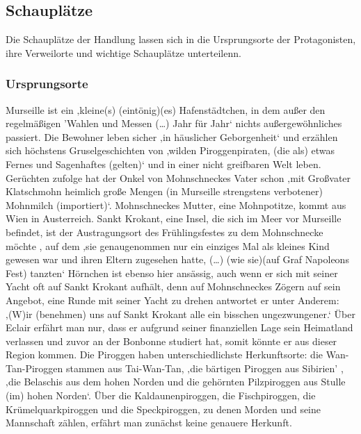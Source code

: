 \subsection{Schauplätze}
Die Schauplätze der Handlung lassen sich in die Ursprungsorte der Protagonisten, ihre Verweilorte und wichtige Schauplätze unterteilenn.

\subsubsection{Ursprungsorte}

Murseille ist ein ‚kleine(s) (eintönig)(es) Hafenstädtchen, in dem außer den regelmäßigen 'Wahlen und Messen (…) Jahr für Jahr‘\cite[S. 10]{pir} nichts außergewöhnliches passiert. Die Bewohner leben sicher ‚in häuslicher Geborgenheit‘ und erzählen sich höchstens Gruselgeschichten von ‚wilden Piroggenpiraten, (die als) etwas Fernes und Sagenhaftes (gelten)‘ \cite[S.10]{pir} und in einer nicht greifbaren Welt leben. Gerüchten zufolge hat der Onkel von Mohnschneckes Vater schon ‚mit Großvater Klatschmohn heimlich große Mengen (in Murseille strengstens verbotener) Mohnmilch (importiert)‘.\cite[S.14]{pir} Mohnschneckes Mutter, eine Mohnpotitze, kommt aus Wien in Austerreich. \cite[S. 13]{pir} Sankt Krokant, eine Insel, die sich im Meer vor Murseille befindet, ist der Austragungsort des Frühlingsfestes zu dem Mohnschnecke möchte \cite[S.17]{pir}, auf dem ‚sie genaugenommen nur ein einziges Mal als kleines Kind gewesen war und ihren Eltern zugesehen hatte, (…) (wie sie)(auf Graf Napoleons Fest) tanzten‘ \cite[S.521]{pir} 
Hörnchen ist ebenso hier ansässig, auch wenn er sich mit seiner Yacht oft auf Sankt Krokant aufhält, denn auf Mohnschneckes Zögern auf sein Angebot, eine Runde mit seiner Yacht zu drehen antwortet er unter Anderem: ‚(W)ir (benehmen) uns auf Sankt Krokant alle ein bisschen ungezwungener.‘\cite[S.25]{pir} 
Über Eclair erfährt man nur, dass er aufgrund seiner finanziellen Lage sein Heimatland verlassen und zuvor an der Bonbonne studiert hat, somit könnte er aus dieser Region kommen. \cite[S.15f]{pir}
Die Piroggen haben unterschiedlichste Herkunftsorte: die Wan-Tan-Piroggen stammen aus Tai-Wan-Tan, \cite[S.8]{pir}
 ‚die bärtigen Piroggen aus Sibirien' \cite[S.8]{pir}, ‚die Belaschis aus dem hohen Norden \cite[S.9]{pir} und die gehörnten Pilzpiroggen aus Stulle (im) hohen Norden‘\cite[S.9]{pir}. Über die Kaldaunenpiroggen, die Fischpiroggen, die Krümelquarkpiroggen und die Speckpiroggen, zu denen Morden und seine Mannschaft zählen, erfährt man zunächst keine genauere Herkunft. \cite[S.9f]{pir}

